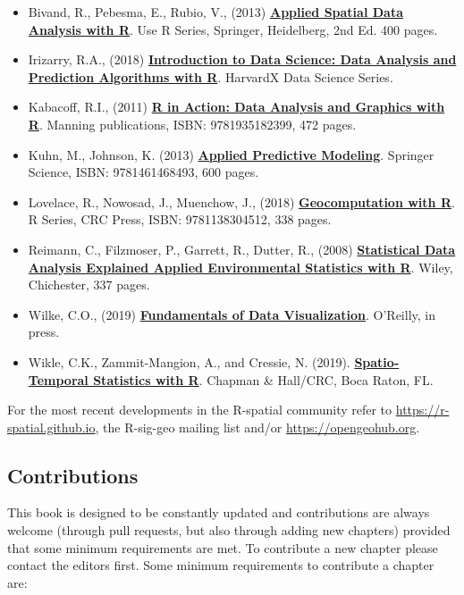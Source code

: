 \documentclass[graybox,natbib,nospthms]{svmono}
\begin{document}
\begin{itemize}
\item
  Bivand, R., Pebesma, E., Rubio, V., (2013)
  \href{http://www.asdar-book.org}{\textbf{Applied Spatial Data Analysis
  with R}}. Use R Series, Springer, Heidelberg, 2nd Ed. 400 pages.
\item
  Irizarry, R.A., (2018)
  \href{https://rafalab.github.io/dsbook/}{\textbf{Introduction to Data
  Science: Data Analysis and Prediction Algorithms with R}}. HarvardX
  Data Science Series.
\item
  Kabacoff, R.I., (2011)
  \href{http://www.manning.com/kabacoff/}{\textbf{R in Action: Data
  Analysis and Graphics with R}}. Manning publications, ISBN:
  9781935182399, 472 pages.
\item
  Kuhn, M., Johnson, K. (2013)
  \href{http://appliedpredictivemodeling.com}{\textbf{Applied Predictive
  Modeling}}. Springer Science, ISBN: 9781461468493, 600 pages.
\item
  Lovelace, R., Nowosad, J., Muenchow, J., (2018)
  \href{https://geocompr.robinlovelace.net}{\textbf{Geocomputation with
  R}}. R Series, CRC Press, ISBN: 9781138304512, 338 pages.
\item
  Reimann, C., Filzmoser, P., Garrett, R., Dutter, R., (2008)
  \href{https://onlinelibrary.wiley.com/doi/book/10.1002/9780470987605}{\textbf{Statistical
  Data Analysis Explained Applied Environmental Statistics with R}}.
  Wiley, Chichester, 337 pages.
\item
  Wilke, C.O., (2019)
  \href{https://serialmentor.com/dataviz/}{\textbf{Fundamentals of Data
  Visualization}}. O'Reilly, in press.
\item
  Wikle, C.K., Zammit-Mangion, A., and Cressie, N. (2019).
  \href{https://spacetimewithr.org}{\textbf{Spatio-Temporal Statistics
  with R}}. Chapman \& Hall/CRC, Boca Raton, FL.
\end{itemize}

For the most recent developments in the R-spatial community refer to
\url{https://r-spatial.github.io}, the R-sig-geo mailing list and/or
\url{https://opengeohub.org}.

\subsection*{Contributions}\label{contributions}

This book is designed to be constantly updated and contributions are
always welcome (through pull requests, but also through adding new
chapters) provided that some minimum requirements are met. To contribute
a new chapter please contact the editors first. Some minimum
requirements to contribute a chapter are:
\end{document}

